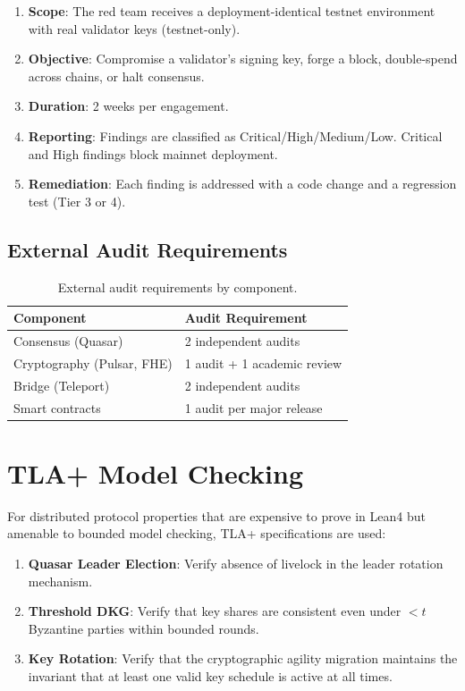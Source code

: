 \documentclass[11pt]{article}
\begin{document}
\begin{enumerate}
\item \textbf{Scope}: The red team receives a deployment-identical testnet environment with real validator keys (testnet-only).
\item \textbf{Objective}: Compromise a validator's signing key, forge a block, double-spend across chains, or halt consensus.
\item \textbf{Duration}: 2 weeks per engagement.
\item \textbf{Reporting}: Findings are classified as Critical/High/Medium/Low. Critical and High findings block mainnet deployment.
\item \textbf{Remediation}: Each finding is addressed with a code change and a regression test (Tier 3 or 4).
\end{enumerate}

\subsection{External Audit Requirements}

\begin{table}[h]
\centering
\begin{tabular}{@{}ll@{}}
\toprule
\textbf{Component} & \textbf{Audit Requirement} \\
\midrule
Consensus (Quasar) & 2 independent audits \\
Cryptography (Pulsar, FHE) & 1 audit + 1 academic review \\
Bridge (Teleport) & 2 independent audits \\
Smart contracts & 1 audit per major release \\
\bottomrule
\end{tabular}
\caption{External audit requirements by component.}
\label{tab:audits}
\end{table}

\section{TLA+ Model Checking}

For distributed protocol properties that are expensive to prove in Lean4 but amenable to bounded model checking, TLA+ specifications are used:

\begin{enumerate}
\item \textbf{Quasar Leader Election}: Verify absence of livelock in the leader rotation mechanism.
\item \textbf{Threshold DKG}: Verify that key shares are consistent even under $< t$ Byzantine parties within bounded rounds.
\item \textbf{Key Rotation}: Verify that the cryptographic agility migration \cite{crypto-agility} maintains the invariant that at least one valid key schedule is active at all times.
\end{enumerate}
\end{document}
